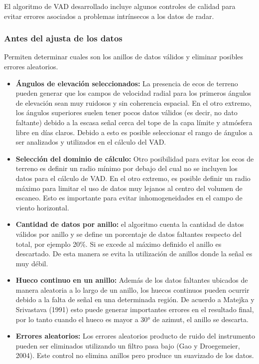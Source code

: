 \documentclass[12pt,spanish,oneside]{book}
\providecommand{\tightlist}{%
  \setlength{\itemsep}{0pt}\setlength{\parskip}{0pt}}
\begin{document}
El algoritmo de VAD desarrollado incluye algunos controles de calidad
para evitar errores asociados a problemas intrínsecos a los datos de
radar.

\subsubsection{Antes del ajusta de los
datos}\label{antes-del-ajusta-de-los-datos}

Permiten determinar cuales son los anillos de datos válidos y eliminar
posibles errores aleatorios.

\begin{itemize}
\tightlist
\item
  \textbf{Ángulos de elevación seleccionados:} La presencia de ecos de
  terreno pueden generar que los campos de velocidad radial para los
  primeros ángulos de elevación sean muy ruidosos y sin coherencia
  espacial. En el otro extremo, los ángulos superiores suelen tener
  pocos datos válidos (es decir, no dato faltante) debido a la escasa
  señal cerca del tope de la capa límite y atmósfera libre en días
  claros. Debido a esto es posible seleccionar el rango de ángulos a ser
  analizados y utilizados en el cálculo del VAD.
\item
  \textbf{Selección del dominio de cálculo:} Otro posibilidad para
  evitar los ecos de terreno es definir un radio mínimo por debajo del
  cual no se incluyen los datos para el cálculo de VAD. En el otro
  extremo, es posible definir un radio máximo para limitar el uso de
  datos muy lejanos al centro del volumen de escaneo. Esto es importante
  para evitar inhomogeneidades en el campo de viento horizontal.
\item
  \textbf{Cantidad de datos por anillo:} el algoritmo cuenta la cantidad
  de datos válidos por anillo y se define un porcentaje de datos
  faltantes respecto del total, por ejemplo 20\%. Si se excede al máximo
  definido el anillo es descartado. De esta manera se evita la
  utilización de anillos donde la señal es muy débil.
\item
  \textbf{Hueco continuo en un anillo:} Además de los datos faltantes
  ubicados de manera aleatoria a lo largo de un anillo, los huecos
  continuos pueden ocurrir debido a la falta de señal en una determinada
  región. De acuerdo a Matejka y Srivastava (1991) esto puede generar
  importantes errores en el resultado final, por lo tanto cuando el
  hueco es mayor a 30° de azimut, el anillo se descarta.
\item
  \textbf{Errores aleatorios:} Los errores aleatorios producto de ruido
  del instrumento pueden ser eliminados utilizando un filtro pasa bajo
  (Gao y Droegemeier, 2004). Este control no elimina anillos pero
  produce un suavizado de los datos.
\end{itemize}
\end{document}
